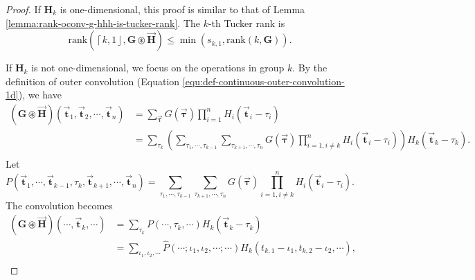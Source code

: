 \documentclass[twoside,11pt]{article}
\def\oconv{\circledast}
\def\rank{\text{rank}}
\def\tvar#1{\mathbf{#1}} %
\def\vsymb#1{\vec{\mathbf{#1}}}
\def\lcerfl#1{\left\lceil{#1}\right\rfloor}
\begin{document}
\begin{proof}
  
    If \(\tvar{H}_k\) is one-dimensional, this proof is similar to that of Lemma \ref{lemma:rank-oconv-g-hhh-is-tucker-rank}. The \(k\)-th Tucker rank is
    \begin{equation*}
      \rank(\lcerfl{k,1}, \tvar{G} \oconv \vsymb{H}) \le \min\left(s_{k,1}, \rank(k, \tvar{G})\right).
    \end{equation*}
  

  
    If \(\tvar{H}_k\) is not one-dimensional, we focus on the operations in group \(k\). By the definition of outer convolution (Equation \ref{equ:def-continuous-outer-convolution-1d}), we have
    \begin{equation*}
      \begin{aligned}
        (\tvar{G} \oconv \vsymb{H}) (\vsymb{t}_1, \vsymb{t}_2, \cdots, \vsymb{t}_n)
         & = \sum_{\vsymb{\tau}} G(\vsymb{\tau}) \prod_{i=1}^{n} H_i(\vsymb{t}_i - \tau_i) \\
         & = \sum_{\tau_k} \left(
        \sum_{\tau_1, \cdots, \tau_{k-1}}
        \sum_{\tau_{k+1}, \cdots, \tau_n}
        G(\vsymb{\tau})
        \prod_{i=1, i \ne k}^{n} H_i(\vsymb{t}_i - \tau_i)
        \right) H_k(\vsymb{t}_k - \tau_k).                                                 \\
      \end{aligned}
    \end{equation*}
    Let
    \begin{equation*}
      P(\vsymb{t}_1, \cdots, \vsymb{t}_{k-1}, \tau_k, \vsymb{t}_{k+1}, \cdots, \vsymb{t}_n)
      = \sum_{\tau_1, \cdots, \tau_{k-1}}
      \sum_{\tau_{k+1}, \cdots, \tau_n}
      G(\vsymb{\tau})
      \prod_{i=1, i \ne k}^{n} H_i(\vsymb{t}_i - \tau_i).
    \end{equation*}
    The convolution becomes
    \begin{equation*}
      \begin{aligned}
        (\tvar{G} \oconv \vsymb{H})(\cdots, \vsymb{t}_k, \cdots)
         & = \sum_{\tau_k} P(\cdots, \tau_k, \cdots) H_k(\vsymb{t}_k - \tau_k) \\
         & = \sum_{\iota_1, \iota_2, \cdots}
        \hat{P}(\cdots; \iota_1, \iota_2, \cdots; \cdots)
        H_k(t_{k,1} - \iota_1, t_{k,2} - \iota_2, \cdots),                     \\
      \end{aligned}
    \end{equation*}

\end{proof}
\end{document}
